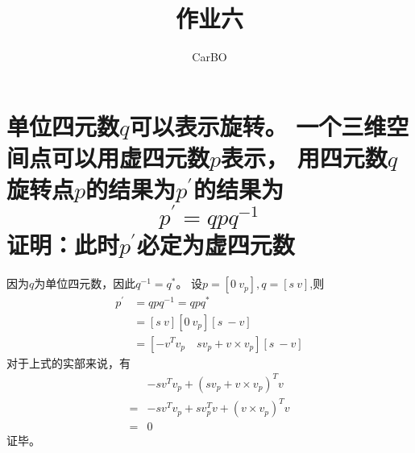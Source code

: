 \documentclass[utf8]{ctexart}
\title{\zihao{1}作业六}
\author{\zihao{-3}CarBO}
\date{}
\begin{document}
\maketitle
    \section{单位四元数$q$可以表示旋转。
            一个三维空间点可以用虚四元数$p$表示，
            用四元数$q$旋转点$p$的结果为$p^\prime$的结果为\[p^\prime=qpq^{-1}\]
            证明：此时$p^\prime$必定为虚四元数}
        因为$q$为单位四元数，因此$q^{-1}=q^*$。
        设$p=[0 \ v_p],q=[s\ v]$,则
        \[\begin{aligned}
            p^\prime &=qpq^{-1}=qpq^*\\
                    &=[s\ v][0 \ v_p][s\ -v]\\
                    &=[-v^Tv_p \quad sv_p+v\times v_p][s\ -v]
        \end{aligned}\]
        对于上式的实部来说，有
        \[\begin{aligned}
            &-sv^Tv_p+(sv_p+v\times v_p)^Tv\\
            =&-sv^Tv_p+sv_p^Tv+(v\times v_p)^Tv\\
            =&0
        \end{aligned}\]
        证毕。
\end{document}
